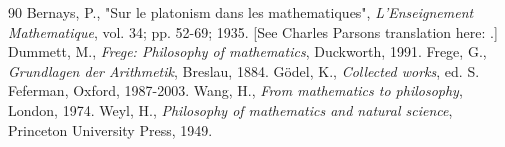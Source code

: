 \documentclass[12pt]{article}
\begin{document}
\begin{thebibliography} {90}
 Bernays, P., "Sur le platonism dans les mathematiques", \emph{L'Enseignement Mathematique}, vol. 34; pp. 52-69; 1935. [See Charles Parsons translation here: .]
 Dummett, M., \emph{Frege: Philosophy of mathematics}, Duckworth, 1991.
 Frege, G., \emph{Grundlagen der Arithmetik}, Breslau, 1884.
 G\"{o}del, K., \emph{Collected works}, ed. S. Feferman, Oxford, 1987-2003.
 Wang, H., \emph{From mathematics to philosophy}, London, 1974.
 Weyl, H., \emph{Philosophy of mathematics and natural science}, Princeton University Press, 1949.
\end{thebibliography}
\end{document}

